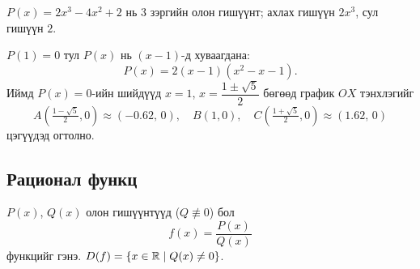 \begin{example}
$P(x)=2x^3-4x^2+2$ нь 3 зэргийн олон гишүүнт; ахлах гишүүн $2x^3$, сул гишүүн $2$.

$P(1)=0$ тул $P(x)$ нь $(x-1)$-д хуваагдана:
\[
P(x)=2(x-1)(x^2-x-1).
\]
Иймд $P(x)=0$-ийн шийдүүд $x=1$, $x=\dfrac{1\pm\sqrt5}{2}$ бөгөөд график $OX$ тэнхлэгийг
\[
A\!\left(\tfrac{1-\sqrt5}{2},0\right)\approx(-0.62,\,0),\quad B(1,0),\quad
C\!\left(\tfrac{1+\sqrt5}{2},0\right)\approx(1.62,\,0)
\]
цэгүүдэд огтолно.
\begin{center}
\end{center}
\end{example}

\subsection{Рационал функц}
\begin{definition}
$P(x)$, $Q(x)$ олон гишүүнтүүд ($Q\not\equiv0$) бол
\[
f(x)=\frac{P(x)}{Q(x)}
\]
функцийг  гэнэ. $D(f)=\{x\in\mathbb{R}\mid Q(x)\neq0\}$.
\end{definition}

